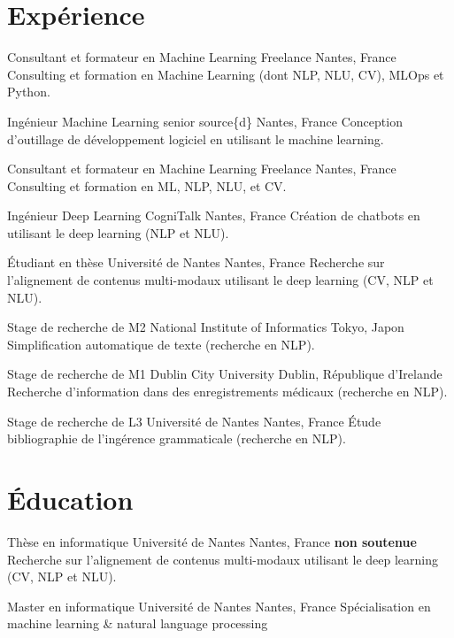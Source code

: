 \documentclass[11pt,a4paper]{moderncv}
\begin{document}
\makecvtitle

\section{Expérience}

%
{Consultant et formateur en Machine Learning}%
{Freelance}%
{Nantes, France}%
{}%
{Consulting et formation en Machine Learning (dont NLP, NLU, CV), MLOps et Python.}

%
{Ingénieur Machine Learning senior}%
{source\{d\}}%
{Nantes, France}%
{}%
{Conception d'outillage de développement logiciel en utilisant le machine learning.}

%
{Consultant et formateur en Machine Learning}%
{Freelance}%
{Nantes, France}%
{}%
{Consulting et formation en ML, NLP, NLU, et CV.}

%
{Ingénieur Deep Learning}%
{CogniTalk}%
{Nantes, France}%
{}%
{Création de chatbots en utilisant le deep learning (NLP et NLU).}

%
{Étudiant en thèse}%
{Université de Nantes}%
{Nantes, France}%
{}%
{Recherche sur l'alignement de contenus multi-modaux utilisant le deep learning (CV, NLP et NLU).}

%
{Stage de recherche de M2}%
{National Institute of Informatics}%
{Tokyo, Japon}%
{}%
{Simplification automatique de texte (recherche en NLP).}

%
{Stage de recherche de M1}%
{Dublin City University}%
{Dublin, République d'Irelande}%
{}%
{Recherche d'information dans des enregistrements médicaux (recherche en NLP).}

%
{Stage de recherche de L3}%
{Université de Nantes}%
{Nantes, France}%
{}%
{Étude bibliographie de l'ingérence grammaticale (recherche en NLP).}

\section{Éducation}

%
{Thèse en informatique}%
{Université de Nantes}%
{Nantes, France}%
{\textbf{non soutenue}}%
{Recherche sur l'alignement de contenus multi-modaux utilisant le deep learning (CV, NLP et NLU).}

%
{Master en informatique}%
{Université de Nantes}%
{Nantes, France}%
{}%
{Spécialisation en machine learning \& natural language processing}
\end{document}
